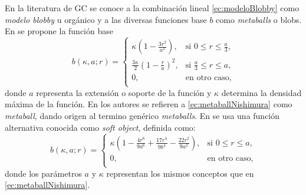 En la literatura de GC se conoce a la combinación lineal \eqref{ec:modeloBlobby} como \emph{modelo blobby} u orgánico y a las diversas funciones base $b$ como \emph{metaballs} o blobs. En \cite{NishimuraMetabolas} se propone la función base
\begin{equation}
\label{ec:metaballNishimura}
 b(\kappa, a; r) = \begin{cases}
            \kappa \left( 1 - \frac{3 r^2}{a^2} \right), & \text{si $0 \leq r \leq \frac{a}{3}$,} \\
	    \frac{3 \kappa}{2} \left( 1 - \frac{r}{a} \right)^2, & \text{si $\frac{a}{3} \leq r \leq a$,} \\
                    0, & \text{en otro caso,} \\
            \end{cases}
\end{equation}
donde $a$ representa la extensión o soporte de la función y $\kappa$ determina la densidad máxima de la función. En \cite{NishimuraMetabolas} los autores se refieren a \eqref{ec:metaballNishimura} como \emph{metaball}, dando origen al termino genérico \emph{metaballs}. En \cite{softObjects} se usa una función alternativa conocida como \emph{soft object}, definida como:
\begin{equation}
\label{ec:softObjects}
 b(\kappa, a; r) = \begin{cases}
            \kappa \left( 1 - \frac{4 r^6}{9 a^6} + \frac{17 r^4}{9 b^4} - \frac{22 r^2}{9 a^2}\right), & \text{si $0 \leq r \leq a$,} \\
	    0, & \text{en otro caso,} \\
            \end{cases}
\end{equation}
donde los parámetros $a$ y $\kappa$ representan los mismos conceptos que en \eqref{ec:metaballNishimura}.


